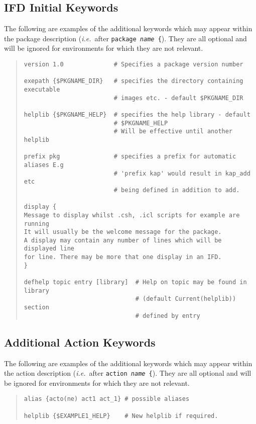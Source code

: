 \documentclass[twoside,11pt]{article}
\newcommand{\xlabel}[1]{}
\begin{document}
\subsection{\xlabel{ifd_initial_keywords}IFD Initial Keywords}
The following are examples of the additional keywords which may appear within 
the package description (\textit{i.e.}\ after \texttt{package \textit{name} 
\{}). 
They are all optional and will be ignored for environments for which they are 
not relevant. 
\begin{quote} \begin{verbatim}
version 1.0              # Specifies a package version number

exepath {$PKGNAME_DIR}   # specifies the directory containing executable
                         # images etc. - default $PKGNAME_DIR

helplib {$PKGNAME_HELP}  # specifies the help library - default 
                         # $PKGNAME_HELP
                         # Will be effective until another helplib

prefix pkg               # specifies a prefix for automatic aliases E.g
                         # 'prefix kap' would result in kap_add etc
                         # being defined in addition to add.

display {                 
Message to display whilst .csh, .icl scripts for example are running
It will usually be the welcome message for the package.
A display may contain any number of lines which will be displayed line
for line. There may be more that one display in an IFD.
}

defhelp topic entry [library]  # Help on topic may be found in library
                               # (default Current(helplib)) section 
                               # defined by entry
\end{verbatim} \end{quote}

\subsection{\xlabel{additional_action_keywords}\label{add_act}Additional 
Action Keywords}
The following are examples of the additional keywords which may appear within
the action description (\textit{i.e.}\ after \texttt{action \textit{name} \{}). 
They are all optional and will be ignored for environments for which they are 
not relevant. 
\begin{quote} \begin{verbatim}
alias {acto(ne) act1 act_1} # possible aliases

helplib {$EXAMPLE1_HELP}    # New helplib if required.
\end{verbatim} \end{quote}
\end{document}
